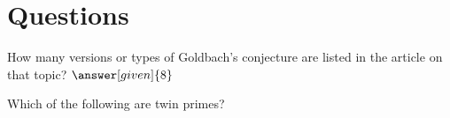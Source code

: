 \documentclass[nooutcomes]{ximera}
\begin{document}
\section{Questions}

\begin{question}
How many versions or types of Goldbach's conjecture are listed in the article on that topic?
$\answer[given]{8}$
\end{question}

\begin{question}
Which of the following are twin primes?
\begin{multipleChoice}
\end{multipleChoice}
\end{question}


%
\end{document}
